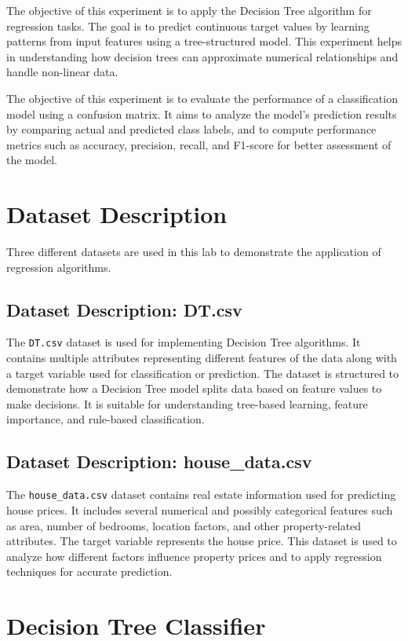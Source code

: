 \documentclass[11pt,a4paper]{report}
\begin{document}
The objective of this experiment is to apply the Decision Tree algorithm for regression tasks. The goal is to predict continuous target values by learning patterns from input features using a tree-structured model. This experiment helps in understanding how decision trees can approximate numerical relationships and handle non-linear data.

The objective of this experiment is to evaluate the performance of a classification model using a confusion matrix. It aims to analyze the model's prediction results by comparing actual and predicted class labels, and to compute performance metrics such as accuracy, precision, recall, and F1-score for better assessment of the model.


\section*{Dataset Description}

Three different datasets are used in this lab to demonstrate the application of regression algorithms.

\subsection*{Dataset Description: DT.csv}
The \texttt{DT.csv} dataset is used for implementing Decision Tree algorithms. It contains multiple attributes representing different features of the data along with a target variable used for classification or prediction. The dataset is structured to demonstrate how a Decision Tree model splits data based on feature values to make decisions. It is suitable for understanding tree-based learning, feature importance, and rule-based classification.

\subsection*{Dataset Description: house\_data.csv}
The \texttt{house\_data.csv} dataset contains real estate information used for predicting house prices. It includes several numerical and possibly categorical features such as area, number of bedrooms, location factors, and other property-related attributes. The target variable represents the house price. This dataset is used to analyze how different factors influence property prices and to apply regression techniques for accurate prediction.

\section{Decision Tree Classifier}\label{decision-tree-classifier}
\end{document}
